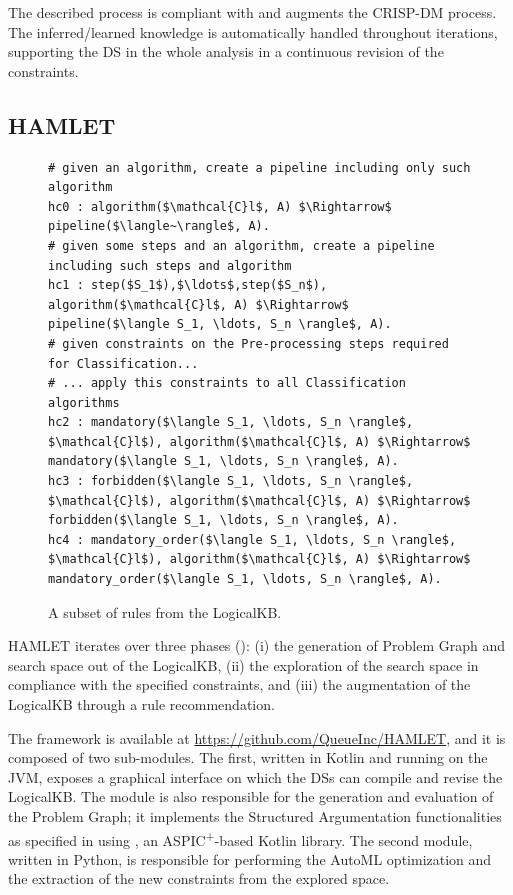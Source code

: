 The described process is compliant with and augments the CRISP-DM process.
The inferred/learned knowledge is automatically handled throughout iterations, supporting the DS in the whole analysis in a continuous revision of the constraints.
\vspace{2cm}

\subsection{HAMLET}\label{ssec:implementation}

\begin{figure}[t]
\begin{lstlisting}[mathescape=true]
# given an algorithm, create a pipeline including only such algorithm
hc0 : algorithm($\mathcal{C}l$, A) $\Rightarrow$ pipeline($\langle~\rangle$, A).
# given some steps and an algorithm, create a pipeline including such steps and algorithm
hc1 : step($S_1$),$\ldots$,step($S_n$), algorithm($\mathcal{C}l$, A) $\Rightarrow$ pipeline($\langle S_1, \ldots, S_n \rangle$, A).
# given constraints on the Pre-processing steps required for Classification...
# ... apply this constraints to all Classification algorithms
hc2 : mandatory($\langle S_1, \ldots, S_n \rangle$, $\mathcal{C}l$), algorithm($\mathcal{C}l$, A) $\Rightarrow$ mandatory($\langle S_1, \ldots, S_n \rangle$, A).
hc3 : forbidden($\langle S_1, \ldots, S_n \rangle$, $\mathcal{C}l$), algorithm($\mathcal{C}l$, A) $\Rightarrow$ forbidden($\langle S_1, \ldots, S_n \rangle$, A).
hc4 : mandatory_order($\langle S_1, \ldots, S_n \rangle$, $\mathcal{C}l$), algorithm($\mathcal{C}l$, A) $\Rightarrow$ mandatory_order($\langle S_1, \ldots, S_n \rangle$, A).
\end{lstlisting}
\caption{A subset of rules from the LogicalKB.}
\label{rules-arg2p}
\end{figure}

HAMLET iterates over three phases (): (i) the generation of Problem Graph and search space out of the LogicalKB, (ii) the exploration of the search space in compliance with the specified constraints, and (iii) the augmentation of the LogicalKB through a rule recommendation.

The framework is available at \url{https://github.com/QueueInc/HAMLET}, and it is composed of two sub-modules. 
The first, written in Kotlin and running on the JVM, exposes a graphical interface on which the DSs can compile and revise the LogicalKB. 
The module is also responsible for the generation and evaluation of the Problem Graph; it implements the Structured Argumentation functionalities as specified in  using \argtup{} \cite{arg2p-jlc}, an ASPIC\textsuperscript{+}-based Kotlin library.
The second module, written in Python, is responsible for performing the AutoML optimization and the extraction of the new constraints from the explored space.

